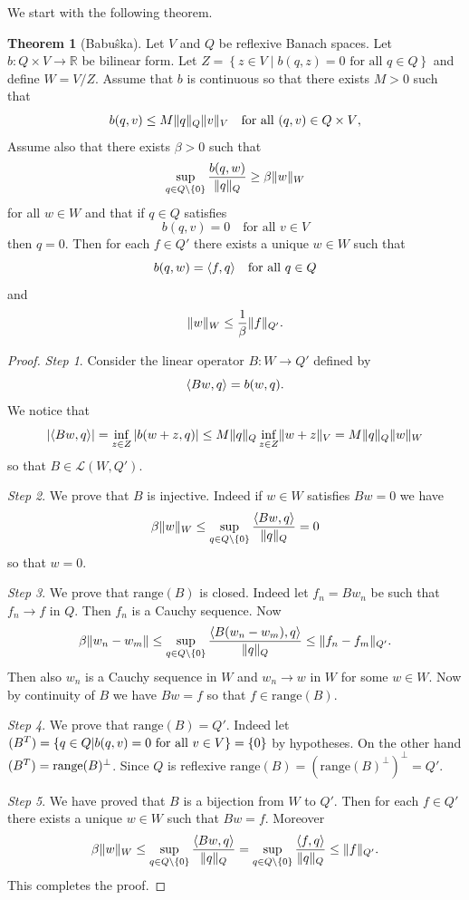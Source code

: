 \documentclass[a4paper,10pt,oneside]{amsbook}
\numberwithin{section}{chapter}
\numberwithin{equation}{chapter}
\theoremstyle{definition}
\newtheorem{thm}[prop]{Theorem}
\DeclarePairedDelimiter{\norm}{\lVert}{\rVert}
\DeclarePairedDelimiter{\dual}{\langle}{\rangle}
\begin{document}
We start with the following theorem.
\begin{thm}[Babu\^ska]
\label{thm:babuska}
Let $V$ and $Q$ be reflexive Banach spaces. Let $b\colon Q\times V\to\mathbb{R}$ be bilinear form. Let $Z=\left\{z\in V\middle|\text{$b(q,z)=0$ for all $q\in Q$}\right\}$ and define $W=V/Z$. Assume that $b$ is continuous so that there exists $M>0$ such that
\[
b(q,v)\le M\norm{q}_Q\norm{v}_V\quad\text{for all $(q,v)\in Q\times V$},
\]
Assume also that there exists $\beta>0$ such that
\[
\sup_{q\in Q\setminus\{0\}}\frac{b(q,w)}{\norm{q}_Q}\ge\beta\norm{w}_W
\]
for all $w\in W$ and that if $q\in Q$ satisfies
\[
b(q,v)=0\quad\text{for all $v\in V$}
\]
then $q=0$. Then for each $f\in Q'$ there exists a unique $w\in W$ such that
\[
b(q,w)=\dual{f,q}\quad\text{for all $q\in Q$}
\]
and
\[
\norm{w}_W\le\frac{1}{\beta}\norm{f}_{Q'}.
\]
\end{thm}
\begin{proof}
\emph{Step 1}. Consider the linear operator $B\colon W\to Q'$ defined by
\[
\dual{Bw,q}=b(w,q).
\]
We notice that
\[
|\dual{Bw,q}|=\inf_{z\in Z}|b(w+z,q)|\le M\norm{q}_Q\inf_{z\in Z}\norm{w+z}_V=M\norm{q}_Q\norm{w}_W
\]
so that $B\in\mathscr{L}(W,Q')$.

\emph{Step 2}. We prove that $B$ is injective. Indeed if $w\in W$ satisfies $Bw=0$ we have
\[
\beta\norm{w}_W\le\sup_{q\in Q\setminus\{0\}}\frac{\dual{Bw,q}}{\norm{q}_Q}=0
\]
so that $w=0$.

\emph{Step 3}. We prove that $\text{range}(B)$ is closed. Indeed let $f_n=Bw_n$ be such that $f_n\to f$ in $Q$. Then $f_n$ is a Cauchy sequence. Now
\[
\beta\norm{w_n-w_m}\le\sup_{q\in Q\setminus\{0\}}\frac{\dual{B(w_n-w_m),q}}{\norm{q}_Q}\le\norm{f_n-f_m}_{Q'}.
\]
Then also $w_n$ is a Cauchy sequence in $W$ and $w_n\to w$ in $W$ for some $w\in W$. Now by continuity of $B$ we have $Bw=f$ so that $f\in\text{range}(B)$.

\emph{Step 4}. We prove that $\text{range}(B)=Q'$. Indeed let $\null(B^T)=\left\{q\in Q\middle|\text{$b(q,v)=0$ for all $v\in V$}\right\}=\{0\}$ by hypotheses. On the other hand $\null(B^T)=\text{range}(B)^\perp$. Since $Q$ is reflexive $\text{range}(B)=(\text{range}(B)^\perp)^\perp=Q'$.

\emph{Step 5}. We have proved that $B$ is a bijection from $W$ to $Q'$. Then for each $f\in Q'$ there exists a unique $w\in W$ such that $Bw=f$. Moreover
\[
\beta\norm{w}_W\le\sup_{q\in Q\setminus\{0\}}\frac{\dual{Bw,q}}{\norm{q}_Q}=\sup_{q\in Q\setminus\{0\}}\frac{\dual{f,q}}{\norm{q}_Q}\le\norm{f}_{Q'}.
\]
This completes the proof.
\end{proof}
\end{document}
